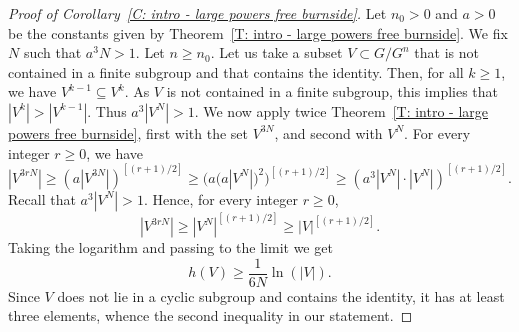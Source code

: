 \documentclass[11pt]{article}
\theoremstyle{plain}
\theoremstyle{definition}
\begin{document}
\begin{proof}[Proof of Corollary~\ref{C: intro - large powers free burnside}]
Let $n_0>0$ and $a>0$ be the constants given by Theorem~\ref{T: intro - large powers free burnside}.
We fix $N$ such that $a^3N>1$.
Let $n\geqslant n_0$.
Let us take a subset $V\subset G/G^n$ that is not contained in a finite subgroup and that contains the identity. Then, for all $k\geqslant 1$, we have $V^{k-1} \subseteq V^k$. As $V$ is not contained in a finite subgroup, this implies that $|V^k|>|V^{k-1}|$. Thus $a^3|V^ N|>1$.
We now apply twice Theorem~\ref{T: intro - large powers free burnside},
first with the set $V^{3N}$, and second with $V^N$.
For every integer $r \geq 0$, we have
\begin{equation*}
|V^{3rN}|
\geq \left(a |V^{3N}| \right)^{[(r+1)/2]}
\geq \bigl(a \bigl(a|V^N|\bigr)^2 \bigr)^{[(r+1)/2]}
\geq \left(a^3|V^N| \cdot |V^N| \right)^{[(r+1)/2]}.
\end{equation*}
Recall that $a^3|V^ N|>1$.
Hence, for every integer $r \geq 0$,
\begin{equation*}
|V^{3rN}|
\geq |V^N| ^{[(r+1)/2]}
\geq |V|^{[(r+1)/2]}.
\end{equation*}
Taking the logarithm and passing to the limit we get
\begin{equation*}
h(V)
\geq \frac 1{6N} \ln(|V|).
\end{equation*}
Since $V$ does not lie in a cyclic subgroup and contains the identity, it has at least three elements, whence the second inequality in our statement.
\end{proof}


\end{document}

